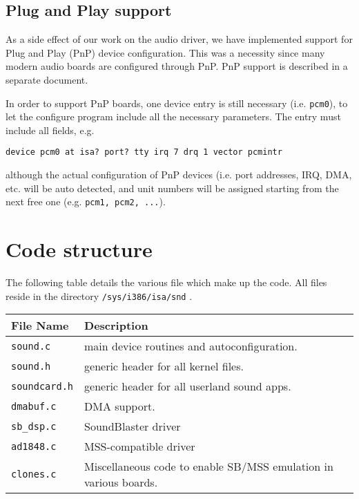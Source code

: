 \documentclass[11pt]{article}
\begin{document}
\subsection{Plug and Play support}

As a side effect of our work on the audio driver, we have implemented
support for Plug and Play (PnP) device configuration. This was a
necessity since many modern audio boards are configured through
PnP. PnP support is described in a separate document.

In order to support PnP boards, one device entry is still necessary
(i.e. {\tt pcm0}), to let the
configure program include all the necessary parameters. The entry must
include all fields, e.g.
\begin{verbatim}
device pcm0 at isa? port? tty irq 7 drq 1 vector pcmintr
\end{verbatim}
although
the actual configuration of PnP devices (i.e. port addresses, IRQ,
DMA, etc.  will be auto detected, and unit numbers will be assigned
starting from the next free one (e.g. {\tt pcm1, pcm2, ...}).

\section{Code structure}

The following table details the various file which make up the code.
All files reside in the directory {\tt /sys/i386/isa/snd} .

\begin{center}
\begin{tabular}{|l|p{4in}|}
\hline
File Name & Description \\
\hline \hline
{\tt sound.c} & main device routines and autoconfiguration.\\
\hline
{\tt sound.h} & generic header for all kernel files.\\
\hline
{\tt soundcard.h} & generic header for all userland sound apps.\\
\hline
{\tt dmabuf.c} & DMA support. \\
\hline
{\tt sb\_dsp.c} & SoundBlaster driver \\
\hline
{\tt ad1848.c} & MSS-compatible driver \\
\hline
{\tt clones.c} & Miscellaneous code to enable SB/MSS emulation in
    various boards. \\
\hline
\end{tabular}
\end{center}
\end{document}
